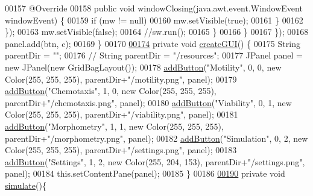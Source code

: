 \begin{DoxyCode}
00157             @Override
00158             \textcolor{keyword}{public} \textcolor{keywordtype}{void} windowClosing(java.awt.event.WindowEvent windowEvent) \{
00159               \textcolor{keywordflow}{if} (mw != null)
00160                 mw.setVisible(\textcolor{keyword}{true});
00161             \}
00162           \});
00163           mw.setVisible(\textcolor{keyword}{false});
00164           \textcolor{comment}{//sw.run(); }
00165         \}
00166       \}
00167     \});
00168     panel.add(btn, c);
00169   \}
00170 
\hypertarget{_main_window_8java_source_l00174}{}\hyperlink{classgui_1_1_main_window_ae3700d532c2ae5e2171016e13584b2d6}{00174}   \textcolor{keyword}{private} \textcolor{keywordtype}{void} \hyperlink{classgui_1_1_main_window_ae3700d532c2ae5e2171016e13584b2d6}{createGUI}() \{
00175     String parentDir = \textcolor{stringliteral}{""};
00176 \textcolor{comment}{//    String parentDir = "/resources";}
00177     JPanel panel = \textcolor{keyword}{new} JPanel(\textcolor{keyword}{new} GridBagLayout());
00178     \hyperlink{classgui_1_1_main_window_aef273df0357bb9cf10e8692fb49c40cb}{addButton}(\textcolor{stringliteral}{"Motility"}, 0, 0, \textcolor{keyword}{new} Color(255, 255, 255), parentDir+\textcolor{stringliteral}{"/motility.png"}, panel);
00179     \hyperlink{classgui_1_1_main_window_aef273df0357bb9cf10e8692fb49c40cb}{addButton}(\textcolor{stringliteral}{"Chemotaxis"}, 1, 0, \textcolor{keyword}{new} Color(255, 255, 255), parentDir+\textcolor{stringliteral}{"/chemotaxis.png"}, panel);
00180     \hyperlink{classgui_1_1_main_window_aef273df0357bb9cf10e8692fb49c40cb}{addButton}(\textcolor{stringliteral}{"Viability"}, 0, 1, \textcolor{keyword}{new} Color(255, 255, 255), parentDir+\textcolor{stringliteral}{"/viability.png"}, panel);
00181     \hyperlink{classgui_1_1_main_window_aef273df0357bb9cf10e8692fb49c40cb}{addButton}(\textcolor{stringliteral}{"Morphometry"}, 1, 1, \textcolor{keyword}{new} Color(255, 255, 255), parentDir+\textcolor{stringliteral}{"/morphometry.png"}, panel);
00182     \hyperlink{classgui_1_1_main_window_aef273df0357bb9cf10e8692fb49c40cb}{addButton}(\textcolor{stringliteral}{"Simulation"}, 0, 2, \textcolor{keyword}{new} Color(255, 255, 255), parentDir+\textcolor{stringliteral}{"/settings.png"}, panel);
00183     \hyperlink{classgui_1_1_main_window_aef273df0357bb9cf10e8692fb49c40cb}{addButton}(\textcolor{stringliteral}{"Settings"}, 1, 2, \textcolor{keyword}{new} Color(255, 204, 153), parentDir+\textcolor{stringliteral}{"/settings.png"}, panel);
00184     this.setContentPane(panel);
00185   \}
00186   
\hypertarget{_main_window_8java_source_l00190}{}\hyperlink{classgui_1_1_main_window_a1f451daf160cbacfab1e7b495789750e}{00190}   \textcolor{keyword}{private} \textcolor{keywordtype}{void} \hyperlink{classgui_1_1_main_window_a1f451daf160cbacfab1e7b495789750e}{simulate}()\{

\end{DoxyCode}
